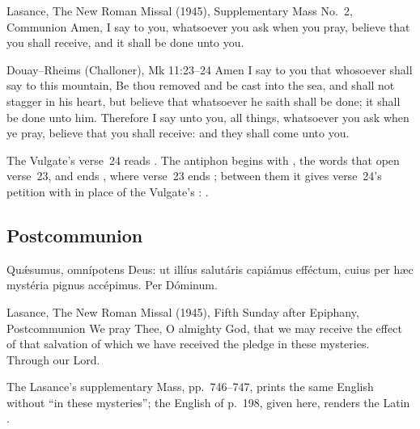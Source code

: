 \begin{englishwitness}{Lasance, The New Roman Missal (1945), Supplementary Mass No.~2, Communion}
Amen, I say to you, whatsoever you ask when you pray, believe that you shall
receive, and it shall be done unto you.
\end{englishwitness}

\begin{englishwitness}{Douay--Rheims (Challoner), Mk 11:23--24}
Amen I say to you that whosoever shall say to this mountain, Be thou removed
and be cast into the sea, and shall not stagger in his heart, but believe that
whatsoever he saith shall be done; it shall be done unto him. Therefore I say
unto you, all things, whatsoever you ask when ye pray, believe that you shall
receive: and they shall come unto you.
\end{englishwitness}

\noindent The Vulgate's verse~24 reads . The
antiphon begins with , the words that open verse~23,
and ends , where verse~23 ends ; between
them it gives verse~24's petition with  in place of the
Vulgate's : .

\subsection{Postcommunion}
\label{proper-postcommunion}


\begin{latinproper}
Quǽsumus, omnípotens Deus: ut illíus salutáris capiámus efféctum, cuius per
hæc mystéria pignus accépimus. Per Dóminum.
\end{latinproper}

\begin{englishwitness}{Lasance, The New Roman Missal (1945), Fifth Sunday after Epiphany, Postcommunion}
We pray Thee, O almighty God, that we may receive the effect of that salvation
of which we have received the pledge in these mysteries. Through our Lord.
\end{englishwitness}

\noindent The Lasance's supplementary Mass, pp.~746--747, prints the same English
without ``in these mysteries''; the English of p.~198, given here, renders the
Latin .

